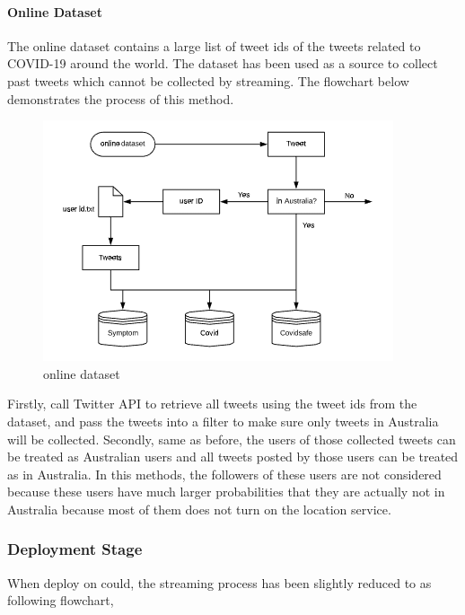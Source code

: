 \paragraph{Online Dataset}

The online dataset contains a large list of tweet ids of the tweets related to COVID-19 around the world. The dataset has been used as a source to collect past tweets which cannot be collected by streaming. The flowchart below demonstrates the process of this method.
\begin{figure}[h!]
\centering
\includegraphics[scale=0.7]{city_analytics/report/images/online.png}
\caption{online dataset}
\label{fig:stream}
\end{figure}

Firstly, call Twitter API to retrieve all tweets using the tweet ids from the dataset, and pass the tweets into a filter to make sure only tweets in Australia will be collected. Secondly, same as before, the users of those collected tweets can be treated as Australian users and all tweets posted by those users can be treated as in Australia. In this methods, the followers of these users are not considered because these users have much larger probabilities that they are actually not in Australia because most of them does not turn on the location service.
\subsubsection{Deployment Stage}
When deploy on could, the streaming process has been slightly reduced to as following flowchart,

